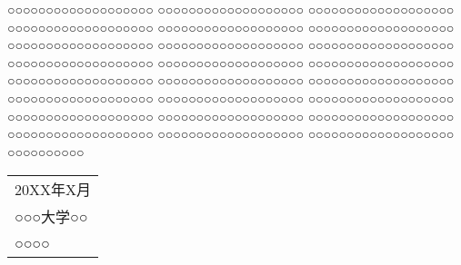 
○○○○○○○○○○○○○○○○○○○
○○○○○○○○○○○○○○○○○○○
○○○○○○○○○○○○○○○○○○○
○○○○○○○○○○○○○○○○○○○
○○○○○○○○○○○○○○○○○○○
○○○○○○○○○○○○○○○○○○○
○○○○○○○○○○○○○○○○○○○
○○○○○○○○○○○○○○○○○○○
○○○○○○○○○○○○○○○○○○○
○○○○○○○○○○○○○○○○○○○
○○○○○○○○○○○○○○○○○○○
○○○○○○○○○○○○○○○○○○○
○○○○○○○○○○○○○○○○○○○
○○○○○○○○○○○○○○○○○○○
○○○○○○○○○○○○○○○○○○○
○○○○○○○○○○○○○○○○○○○
○○○○○○○○○○○○○○○○○○○
○○○○○○○○○○○○○○○○○○○
○○○○○○○○○○○○○○○○○○○
○○○○○○○○○○○○○○○○○○○
○○○○○○○○○○○○○○○○○○○
○○○○○○○○○○○○○○○○○○○
○○○○○○○○○○○○○○○○○○○
○○○○○○○○○○○○○○○○○○○
○○○○○○○○○○

\vspace{\baselineskip}
\hfill
\begin{tabular}{l@{}}
20XX年X月\\
○○○大学○○\\
○○○○
\end{tabular}

